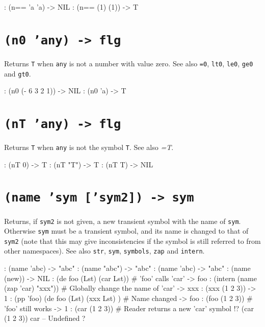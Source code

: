 \begin{wideverbatim}
: (n== 'a 'a)
-> NIL
: (n== (1) (1))
-> T
\end{wideverbatim}

 
\section*{\texttt{(n0 'any) -> flg}}
\label{sec:func-ref-N-(n0 'any) -> flg}


Returns \texttt{T} when \texttt{any} is not a number with value zero.
See also \texttt{=0}, \texttt{lt0}, \texttt{le0}, \texttt{ge0} and
\texttt{gt0}.


\begin{wideverbatim}
: (n0 (- 6 3 2 1))
-> NIL
: (n0 'a)
-> T
\end{wideverbatim}

 
\section*{\texttt{(nT 'any) -> flg}}
\label{sec:func-ref-N-(nT 'any) -> flg}


Returns \texttt{T} when \texttt{any} is not the symbol \texttt{T}. See also
\emph{=T}.

\begin{wideverbatim}
: (nT 0)
-> T
: (nT "T")
-> T
: (nT T)
-> NIL
\end{wideverbatim}

 
\section*{\texttt{(name 'sym ['sym2]) -> sym}}
\label{sec:func-ref-N-(name 'sym ['sym2]) -> sym}


Returns, if \texttt{sym2} is not given, a new transient symbol with the name of
\texttt{sym}. Otherwise \texttt{sym} must be a transient symbol, and its name is
changed to that of \texttt{sym2} (note that this may give inconsistencies if
the symbol is still referred to from other namespaces). See also \texttt{str},
\texttt{sym}, \texttt{symbols}, \texttt{zap} and \texttt{intern}.


\begin{wideverbatim}
: (name 'abc)
-> "abc"
: (name "abc")
-> "abc"
: (name '{abc})
-> "abc"
: (name (new))
-> NIL
: (de foo (Lst) (car Lst))  # 'foo' calls 'car'
-> foo
: (intern (name (zap 'car) "xxx"))  # Globally change the name of 'car'
-> xxx
: (xxx (1 2 3))
-> 1
: (pp 'foo)
(de foo (Lst)
   (xxx Lst) )                      # Name changed
-> foo
: (foo (1 2 3))                     # 'foo' still works
-> 1
: (car (1 2 3))                     # Reader returns a new 'car' symbol
!? (car (1 2 3))
car -- Undefined
?
\end{wideverbatim}

